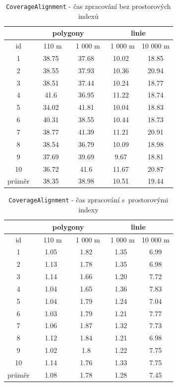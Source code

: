 \begin{table}[ht]
 \centering
   \caption{\texttt{Coverage\-Alignment} - 
	    čas zpracování bez prostorových indexů}
  \begin{tabular}{|c|c|c|c|c|}
   \hline
      & \multicolumn{2}{c|}{polygony} & 
 	\multicolumn{2}{c|}{linie} \\
   \hline
    id  &  ~~110 m~ & ~1 000 m & ~1 000 m & 10 000 m\\
   \hline
   \hline
1	&	38.75	&	37.68	&	10.02	&	18.85	\\
2	&	38.55	&	37.93	&	10.36	&	20.94	\\
3	&	38.51	&	37.44	&	10.24	&	18.77	\\
4	&	41.6	&	36.95	&	11.22	&	18.74	\\
5	&	34.02	&	41.81	&	10.04	&	18.83	\\
6	&	40.31	&	38.55	&	10.44	&	18.73	\\
7	&	38.77	&	41.39	&	11.21	&	20.91	\\
8	&	38.54	&	36.79	&	10.09	&	18.98	\\
9	&	37.69	&	39.69	&	9.67	&	18.81	\\
10	&	36.72	&	41.6	&	11.67	&	20.87	\\
   \hline
   \hline
   průměr & 38.35 & 38.98 & 10.51 & 19.44 \\
   \hline
  \end{tabular}
   \label{tab:ca-bez}
\end{table}
 
\begin{table}[ht]
 \centering
   \caption{\texttt{Coverage\-Alignment} - 
	    čas zpracování s~prostorovými indexy}
  \begin{tabular}{|c|c|c|c|c|}
   \hline
      & \multicolumn{2}{c|}{polygony} & 
 	\multicolumn{2}{c|}{linie} \\
   \hline
    id  &  ~~110 m~ & ~1 000 m & ~1 000 m & 10 000 m\\
   \hline
   \hline
1	&	1.05	&	1.82	&	1.35	&	6.99	\\
2	&	1.13	&	1.78	&	1.35	&	6.98	\\
3	&	1.14	&	1.66	&	1.20	&	7.72	\\
4	&	1.04	&	1.65	&	1.36	&	7.83	\\
5	&	1.04	&	1.79	&	1.24	&	7.04	\\
6	&	1.03	&	1.79	&	1.21	&	7.77	\\
7	&	1.06	&	1.87	&	1.32	&	7.73	\\
8	&	1.12	&	1.84	&	1.21	&	6.98	\\
9	&	1.02	&	1.8	&	1.22	&	7.75	\\
10	&	1.14	&	1.76	&	1.33	&	7.75	\\
   \hline
   \hline
   průměr & 1.08 & 1.78 & 1.28 & 7.45 \\
   \hline
  \end{tabular}
   \label{tab:ca-s}
\end{table}

